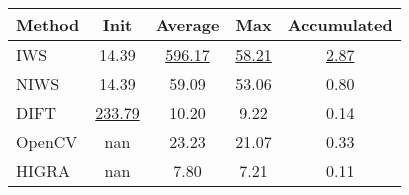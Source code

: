 \begin{table}
\centering
\label{tab:2d_exp_big}
\begin{tabular}{|l|c|c|c|c|}
\hline
Method & Init & Average & Max & Accumulated \\
\hline
IWS & 14.39 & \underline{596.17} & \underline{58.21} & \underline{2.87} \\
NIWS & 14.39 & 59.09 & 53.06 & 0.80 \\
DIFT & \underline{233.79} & 10.20 & 9.22 & 0.14 \\
OpenCV & nan & 23.23 & 21.07 & 0.33 \\
HIGRA & nan & 7.80 & 7.21 & 0.11 \\
\hline
\end{tabular}
\end{table}
